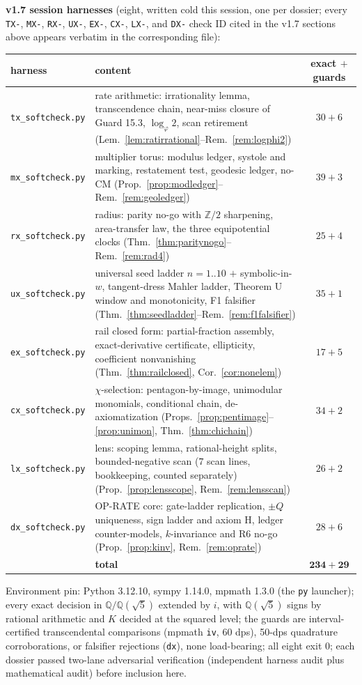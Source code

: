 \documentclass[11pt]{article}
\newcommand{\hx}[1]{\textcolor{cC}{\footnotesize\texttt{#1}}}
\newcommand{\Q}{\mathbb{Q}}
\newcommand{\Z}{\mathbb{Z}}
\newcommand{\gp}{\varphi}
\theoremstyle{plain}
\theoremstyle{definition}
\theoremstyle{remark}
\begin{document}
\smallskip\noindent
\textbf{v1.7 session harnesses} (eight, written cold this session, one per
dossier; every \hx{TX-}, \hx{MX-}, \hx{RX-}, \hx{UX-}, \hx{EX-},
\hx{CX-}, \hx{LX-}, and \hx{DX-} check ID cited in the v1.7 sections
above appears verbatim in the corresponding file):
\begin{center}\footnotesize\setlength{\tabcolsep}{4pt}
\begin{tabular}{@{}lp{10.7cm}c@{}}
\toprule
harness & content & exact $+$ guards\\
\midrule
\texttt{tx\_softcheck.py} & rate arithmetic: irrationality lemma, transcendence chain, near-miss closure of Guard 15.3, $\log_\gp2$, scan retirement (Lem.~\ref{lem:ratirrational}--Rem.~\ref{rem:logphi2}) & $30+6$\\
\texttt{mx\_softcheck.py} & multiplier torus: modulus ledger, systole and marking, restatement test, geodesic ledger, no-CM (Prop.~\ref{prop:modledger}--Rem.~\ref{rem:geoledger}) & $39+3$\\
\texttt{rx\_softcheck.py} & radius: parity no-go with $\Z/2$ sharpening, area-transfer law, the three equipotential clocks (Thm.~\ref{thm:paritynogo}--Rem.~\ref{rem:rad4}) & $25+4$\\
\texttt{ux\_softcheck.py} & universal seed ladder $n=1..10$ $+$ symbolic-in-$w$, tangent-dress Mahler ladder, Theorem U window and monotonicity, F1 falsifier (Thm.~\ref{thm:seedladder}--Rem.~\ref{rem:f1falsifier}) & $35+1$\\
\texttt{ex\_softcheck.py} & rail closed form: partial-fraction assembly, exact-derivative certificate, ellipticity, coefficient nonvanishing (Thm.~\ref{thm:railclosed}, Cor.~\ref{cor:nonelem}) & $17+5$\\
\texttt{cx\_softcheck.py} & $\chi$-selection: pentagon-by-image, unimodular monomials, conditional chain, de-axiomatization (Props.~\ref{prop:pentimage}--\ref{prop:unimon}, Thm.~\ref{thm:chichain}) & $34+2$\\
\texttt{lx\_softcheck.py} & lens: scoping lemma, rational-height splits, bounded-negative scan ($7$ scan lines, bookkeeping, counted separately) (Prop.~\ref{prop:lensscope}, Rem.~\ref{rem:lensscan}) & $26+2$\\
\texttt{dx\_softcheck.py} & OP-RATE core: gate-ladder replication, $\pm Q$ uniqueness, sign ladder and axiom H, ledger counter-models, $k$-invariance and R6 no-go (Prop.~\ref{prop:kinv}, Rem.~\ref{rem:oprate}) & $28+6$\\
\midrule
 & \textbf{total} & $\mathbf{234+29}$\\
\bottomrule
\end{tabular}
\end{center}
Environment pin: Python 3.12.10, sympy 1.14.0, mpmath 1.3.0 (the
\texttt{py} launcher); every exact decision in $\Q/\Q(\sqrt5)$ extended by
$i$, with $\Q(\sqrt5)$ signs by rational arithmetic and $K$ decided at the
squared level; the guards are interval-certified transcendental
comparisons (mpmath \texttt{iv}, 60 dps), 50-dps quadrature
corroborations, or falsifier rejections (\texttt{dx}), none load-bearing;
all eight exit 0; each dossier passed two-lane adversarial verification
(independent harness audit plus mathematical audit) before inclusion here.
\end{document}
